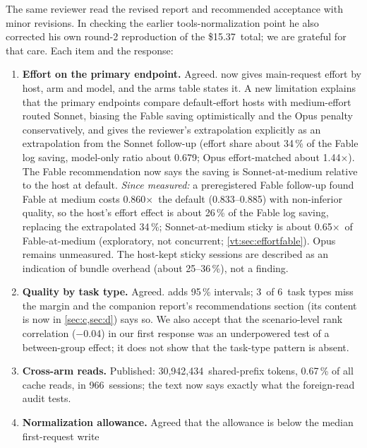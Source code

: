 \documentclass[11pt,letterpaper]{article}
\newcommand{\X}{\ensuremath{\times}}
\newcommand{\EfCI}{0.833--0.885}
\newcommand{\EfRatio}{0.860}
\newcommand{\EfShare}{26}
\newcommand{\EfStickyVsMedium}{0.65}
\newcommand{\RgCrossSessions}{966}
\newcommand{\RgCrossShare}{0.67}
\newcommand{\RgCrossTokens}{30{,}942{,}434}
\newcommand{\RgEffShareFable}{34}
\newcommand{\RgModelOnlyFable}{0.679}
\newcommand{\RgNTask}{6}
\newcommand{\RgNTaskFail}{3}
\newcommand{\RgOpusMatched}{1.44}
\newcommand{\RgOverheadFable}{25}
\newcommand{\RgOverheadOpus}{36}
\newcommand{\RvSpearman}{$-$0.04}
\newcommand{\ToolsDeltaTotal}{15.37}
\begin{document}
The same reviewer read the revised report and recommended acceptance with minor revisions. In checking the earlier
tools-normalization point he also corrected his own round-2 reproduction of the \$\ToolsDeltaTotal\ total; we are
grateful for that care. Each item and the response:
\begin{enumerate}[leftmargin=1.6em]
  \item \textbf{Effort on the primary endpoint.} Agreed.  now gives main-request effort by host,
    arm and model, and the arms table states it. A new limitation explains that the primary endpoints compare
    default-effort hosts with medium-effort routed Sonnet, biasing the Fable saving optimistically and the Opus
    penalty conservatively, and gives the reviewer's extrapolation explicitly as an extrapolation from the Sonnet
    follow-up (effort share about \RgEffShareFable\,\% of the Fable log saving, model-only ratio about
    \RgModelOnlyFable; Opus effort-matched about \RgOpusMatched\X). The Fable recommendation now says the saving is
    Sonnet-at-medium relative to the host at default. \emph{Since measured:} a preregistered Fable follow-up found
    Fable at medium costs \EfRatio\X\ the default (\EfCI) with non-inferior quality, so the host's effort effect is
    about \EfShare\,\% of the Fable log saving, replacing the extrapolated \RgEffShareFable\,\%; Sonnet-at-medium sticky
    is about \EfStickyVsMedium\X\ of Fable-at-medium (exploratory, not concurrent; \cref{vt:sec:effortfable}). Opus
    remains unmeasured. The host-kept sticky sessions are
    described as an indication of bundle overhead (about \RgOverheadFable--\RgOverheadOpus\,\%), not a finding.
  \item \textbf{Quality by task type.} Agreed.  adds 95\,\% intervals; \RgNTaskFail\ of \RgNTask\
    task types miss the margin and the companion report's recommendations section (its content is now in \cref{sec:c,sec:d}) says so. We also accept that the scenario-level rank correlation
    (\RvSpearman) in our first response was an underpowered test of a between-group effect; it does not show that
    the task-type pattern is absent.
  \item \textbf{Cross-arm reads.} Published: \RgCrossTokens\ shared-prefix tokens, \RgCrossShare\,\% of all cache
    reads, in \RgCrossSessions\ sessions; the text now says exactly what the foreign-read audit tests.
  \item \textbf{Normalization allowance.} Agreed that the allowance is below the median first-request write

\end{enumerate}
\end{document}
